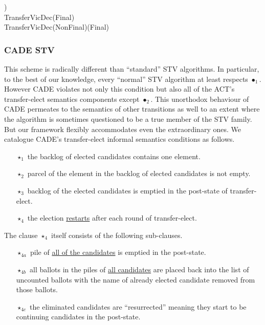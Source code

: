\documentclass[10pt,conference]{IEEEtran}
\renewcommand{\HOLConst}[1]{{\textsf{\upshape #1}}}
\renewcommand{\HOLSymConst}[1]{\HOLConst{#1}}
\begin{document}
\begin{small}
\begin{holthmenv}
\;\;\;\;\;\HOLConst{subpile1}\;\;\;\;\HOLSymConst{\HOLTokenConj{}}\;\HOLConst{subpile2}\;\;\;)\\
\HOLConst{TransferVicDec}\;\;(\HOLConst{Final}\;)\;\;\HOLSymConst{\HOLTokenEquiv{}}\;\HOLConst{F}\\
\HOLConst{TransferVicDec}\;\;(\HOLConst{NonFinal}\;)\;(\HOLConst{Final}\;)\;\HOLSymConst{\HOLTokenEquiv{}}\;\HOLConst{F}
\end{holthmenv}
\end{small}
\subsubsection{CADE STV}
This scheme is radically different than ``standard'' STV algorithms. In particular, to the best of our knowledge, every ``normal'' STV algorithm at least respects $\bullet_{1}$. However CADE violates not only this condition but also all of the ACT's transfer-elect semantics components except $\bullet_{2}$. This unorthodox behaviour of CADE permeates to the semantics of other transitions as well to an extent where the algorithm is sometimes questioned to be a true member  of the STV family. But our framework flexibly  accommodates even the extraordinary ones. We catalogue CADE's transfer-elect informal semantics  conditions as follows.
\begin{itemize}
\item[$\star_{1}$] the backlog of  elected candidates contains one element.
\item[$\star_{2}$] parcel of the element in the backlog of elected candidates is not empty.
\item[$\star_{3}$] backlog of the elected candidates is emptied in the post-state of transfer-elect.
\item[$\star_{4}$] the election \underline{restarts} after each round of transfer-elect.
\end{itemize}  
The clause $\star_{4}$ itself consists of the following sub-clauses.
\begin{itemize}
\item[$\star_{4a}$] pile of \underline{all of the candidates} is emptied in the post-state.
\item[$\star_{4b}$] all ballots in the piles of \underline{all candidates} are placed back into the list of uncounted ballots with the name of already elected candidate removed from those ballots.
\item[$\star_{4c}$] the eliminated candidates are ``resurrected'' meaning they start to be continuing candidates in the post-state.  
\end{itemize}
\end{document}
